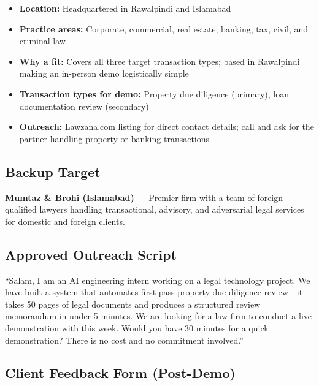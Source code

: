 \documentclass[12pt, a4paper]{article}
\begin{document}
\begin{itemize}[leftmargin=1.5cm]
    \item \textbf{Location:} Headquartered in Rawalpindi and Islamabad
    \item \textbf{Practice areas:} Corporate, commercial, real estate, banking,
    tax, civil, and criminal law
    \item \textbf{Why a fit:} Covers all three target transaction types; based
    in Rawalpindi making an in-person demo logistically simple
    \item \textbf{Transaction types for demo:} Property due diligence (primary),
    loan documentation review (secondary)
    \item \textbf{Outreach:} Lawzana.com listing for direct contact details;
    call and ask for the partner handling property or banking transactions
\end{itemize}

\subsection{Backup Target}

\textbf{Mumtaz \& Brohi (Islamabad)} --- Premier firm with a team of
foreign-qualified lawyers handling transactional, advisory, and adversarial legal
services for domestic and foreign clients.

\subsection{Approved Outreach Script}

\begin{scriptbox}
``Salam, I am an AI engineering intern working on a legal technology project.
We have built a system that automates first-pass property due diligence
review---it takes 50 pages of legal documents and produces a structured review
memorandum in under 5 minutes. We are looking for a law firm to conduct a live
demonstration with this week. Would you have 30 minutes for a quick
demonstration? There is no cost and no commitment involved.''
\end{scriptbox}

\subsection{Client Feedback Form (Post-Demo)}
\end{document}
